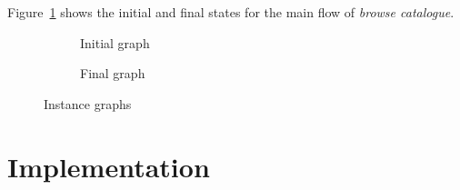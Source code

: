 \begin{example} Figure~\ref{fig:tests:graphs} shows the initial and final states for the main flow of \emph{browse catalogue}.

\begin{figure}[!ht]
  \centering
  \begin{subfigure}[t]{.5\textwidth}
    \centerline{}
    \caption{Initial graph}
  \end{subfigure}%
  \begin{subfigure}[t]{.5\textwidth}
    \centerline{}
    \caption{Final graph}
  \end{subfigure}
  \caption{Instance graphs}\label{fig:tests:graphs}
\end{figure}
\end{example}

\section{Implementation} 

